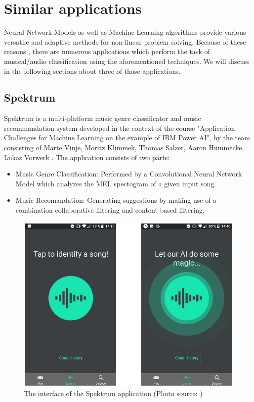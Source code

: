\chapter{Similar applications}

Neural Network Models as well as Machine Learning algorithms provide various versatile and adaptive methods for non-linear problem solving. Because of these reasons , there are numerous applications which perform the task of musical/audio classification using the aforementioned techniques. We will discuss in the following sections about three of those applications.

\section{Spektrum}

Spektrum is a multi-platform music genre classificator and music recommandation system developed in the context of the course "Application Challenges for
Machine Learning on the example of IBM Power AI", by the team consisting of Marte Vinje, Moritz Klimmek, Thomas Salzer, Aaron Hümmecke, Lukas Vorwerk \cite{spektrum} . The application consists of two parts:
\begin{itemize}
	\item Music Genre Classification: Performed by a Convolutional Neural Network Model which analyzes the MEL spectogram of a given input song.
	\item Music Recomandation: Generating suggestions by making use of a combination collaborative filtering
		and content based filtering.
\end{itemize}

\begin{figure}[H]
	\centering
	\includegraphics{images/spektrum.png}
	\caption{The interface of the Spektrum application (Photo source: \cite{spektrum})}
\label{spektrum}
\end{figure}


